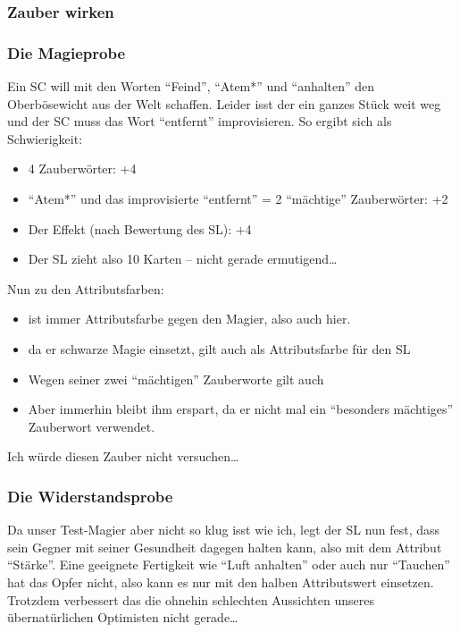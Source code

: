 \subsubsection{Zauber wirken}

\subsubsection{Die Magieprobe}

Ein SC will mit den Worten "`Feind"', "`Atem*"' und "`anhalten"' den Oberbösewicht aus der Welt schaffen. Leider isst der ein ganzes Stück weit weg und der SC muss das Wort "`entfernt"' improvisieren. So ergibt sich als Schwierigkeit:
\begin{itemize}
\item 4 Zauberwörter: +4
\item "`Atem*"' und das improvisierte "`entfernt"' = 2 "`mächtige"' Zauberwörter: +2
\item Der Effekt (nach Bewertung des SL): +4
\item Der SL zieht also 10 Karten -- nicht gerade ermutigend\dots
\end{itemize}
Nun zu den Attributsfarben:
\begin{itemize}
\item \karo ist immer Attributsfarbe gegen den Magier, also auch hier.
\item da er schwarze Magie einsetzt, gilt auch \herz als Attributsfarbe für den SL
\item Wegen seiner zwei "`mächtigen"' Zauberworte gilt auch \kreuz
\item Aber immerhin bleibt ihm \pik erspart, da er nicht mal ein "`besonders mächtiges"' Zauberwort verwendet.
\end{itemize}
Ich würde diesen Zauber nicht versuchen\dots

\subsubsection{Die Widerstandsprobe}

Da unser Test-Magier aber nicht so klug isst wie ich, legt der SL nun fest, dass sein Gegner mit seiner Gesundheit dagegen halten kann, also mit dem Attribut "`Stärke"'. Eine geeignete Fertigkeit wie "`Luft anhalten"' oder auch nur "`Tauchen"' hat das Opfer nicht, also kann es nur mit den halben Attributswert einsetzen.
Trotzdem verbessert das die ohnehin schlechten Aussichten unseres übernatürlichen Optimisten nicht gerade\dots

